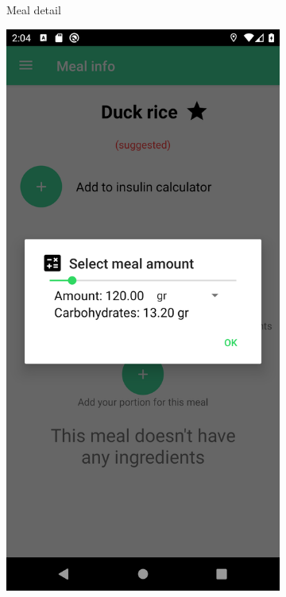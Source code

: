 \begin{figure}[H]
\begin{center}
\begin{subfigure}{.3\textwidth}
            \caption{Meal detail} 
        \end{subfigure}
        \begin{subfigure}{.3\textwidth}
            \includegraphics[scale=0.1, width=\textwidth]{_figures/add_portion.png}

\end{subfigure}
\end{center}
\end{figure}

